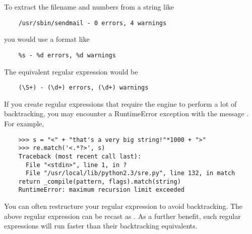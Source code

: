 To extract the filename and numbers from a string like

\begin{verbatim}
    /usr/sbin/sendmail - 0 errors, 4 warnings
\end{verbatim}

you would use a  format like

\begin{verbatim}
    %s - %d errors, %d warnings
\end{verbatim}

The equivalent regular expression would be

\begin{verbatim}
    (\S+) - (\d+) errors, (\d+) warnings
\end{verbatim}


If you create regular expressions that require the engine to perform a lot
of backtracking, you may encounter a RuntimeError exception with the message
.  For example,

\begin{verbatim}
    >>> s = "<" + "that's a very big string!"*1000 + ">"
    >>> re.match('<.*?>', s)
    Traceback (most recent call last):
      File "<stdin>", line 1, in ?
      File "/usr/local/lib/python2.3/sre.py", line 132, in match
	return _compile(pattern, flags).match(string)
    RuntimeError: maximum recursion limit exceeded
\end{verbatim}

You can often restructure your regular expression to avoid backtracking.
The above regular expression can be recast as \regexp{\textless
[\textasciicircum \textgreater]*\textgreater}.  As a further
benefit, such regular expressions will run faster than their backtracking
equivalents.
